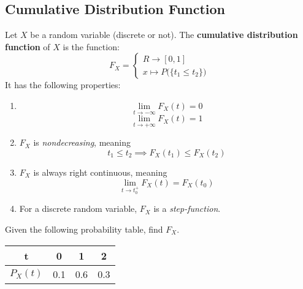 \documentclass{article}
\begin{document}
\subsection{Cumulative Distribution Function}
\begin{defn}
	Let $X$ be a random variable (discrete or not). The \textbf{cumulative distribution function} of $X$ is the function:
	$$ F_X = \begin{cases}
	R \to [0,1] \\
	x \mapsto P \big( \{ t_1 \leq t_2 \} \big)
	\end{cases}$$
	It has the following properties:
	\begin{multicols}{2}
		\begin{enumerate}[(1)]
			\item $$\lim\limits_{t \to - \infty} F_X (t) = 0$$ $$\lim\limits_{t \to + \infty} F_X (t) = 1$$ 
			\item $F_X$ is \emph{nondecreasing}, meaning $$t_1 \leq t_2 \implies F_X(t_1) \leq F_X(t_2)$$
			\item $F_X$ is always right continuous, meaning $$\lim_{t \to t_0^+} F_X(t) = F_X(t_0) $$
			\item For a discrete random variable, $F_X$ is a \emph{step-function}.
		\end{enumerate}
	\end{multicols}
\end{defn}
\pagebreak
\begin{exmp}
	Given the following probability table, find $F_X$.
	\begin{table}[h]
		\begin{tabular}{c|c|c|c}
			t  & 0        & 1 & 2        \\ \hline
			$P_X(t)$ & 0.1 & 0.6 & 0.3
		\end{tabular}
	\end{table}
\end{exmp}
\end{document}
